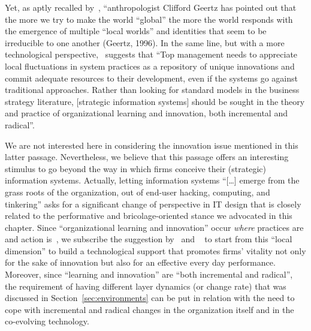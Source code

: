 \documentclass{article}
\begin{document}
Yet, as aptly recalled by~\citet{lanzara_between_1999}, ``anthropologist Clifford Geertz has pointed out that the more we try to make the world ``global'' the more the world responds with the emergence of multiple ``local worlds'' and identities that seem to be irreducible to one another (Geertz, 1996). In the same line, but with a more technological perspective,~\citet{ciborra_thinking_1992} suggests that ``Top management needs to appreciate local fluctuations in system practices as a repository of unique innovations and commit adequate resources to their development, even if the systems go against traditional approaches. Rather than looking for standard models in the business strategy literature, [strategic information systems] should be sought in the theory and practice of organizational learning and innovation, both incremental and radical''.

We are not interested here in considering the innovation issue mentioned in this latter passage. Nevertheless, we believe that this passage offers an interesting stimulus to go beyond the way in which firms conceive their (strategic) information systems.  Actually, letting information systems ``[\ldots] emerge from the grass roots of the organization, out of end-user hacking, computing, and tinkering''  asks for a significant change of perspective in IT design that is closely related to the performative and bricolage-oriented stance we advocated in this chapter. Since ``organizational learning and innovation'' occur \emph{where} practices are and action is~\citep{dourish_where_2001}, we subscribe the suggestion by~\citet{ciborra_thinking_1992} and ~\citet{lanzara_between_1999} to start from this ``local dimension'' to build a technological support that promotes firms' vitality not only for the sake of innovation but also for an effective every day performance. Moreover, since ``learning and innovation''  are ``both  incremental and radical'', the requirement of having different layer dynamics (or change rate) that was discussed in Section~\ref{sec:environments} can be put in relation with the need to cope with incremental and radical changes in the organization itself and in the co-evolving technology.
\end{document}
